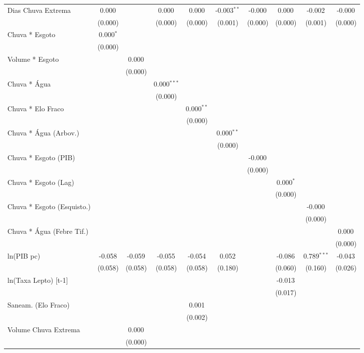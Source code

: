 \documentclass[12pt, a4paper]{article}
\begin{document}
\begin{landscape}
\begin{table}[p]
{\begin{tabular}{@{\extracolsep{5pt}}lccccccccc}
 Dias Chuva Extrema & 0.000$^{}$ & & 0.000$^{}$ & 0.000$^{}$ & -0.003$^{**}$ & -0.000$^{}$ & 0.000$^{}$ & -0.002$^{}$ & -0.000$^{}$ \\
& (0.000) & & (0.000) & (0.000) & (0.001) & (0.000) & (0.000) & (0.001) & (0.000) \\
 Chuva * Esgoto & 0.000$^{*}$ & & & & & & & & \\
& (0.000) & & & & & & & & \\
 Volume * Esgoto & & 0.000$^{}$ & & & & & & & \\
& & (0.000) & & & & & & & \\
 Chuva * Água & & & 0.000$^{***}$ & & & & & & \\
& & & (0.000) & & & & & & \\
 Chuva * Elo Fraco & & & & 0.000$^{**}$ & & & & & \\
& & & & (0.000) & & & & & \\
 Chuva * Água (Arbov.) & & & & & 0.000$^{**}$ & & & & \\
& & & & & (0.000) & & & & \\
 Chuva * Esgoto (PIB) & & & & & & -0.000$^{}$ & & & \\
& & & & & & (0.000) & & & \\
 Chuva * Esgoto (Lag) & & & & & & & 0.000$^{*}$ & & \\
& & & & & & & (0.000) & & \\
 Chuva * Esgoto (Esquisto.) & & & & & & & & -0.000$^{}$ & \\
& & & & & & & & (0.000) & \\
 Chuva * Água (Febre Tif.) & & & & & & & & & 0.000$^{}$ \\
& & & & & & & & & (0.000) \\
 ln(PIB pc) & -0.058$^{}$ & -0.059$^{}$ & -0.055$^{}$ & -0.054$^{}$ & 0.052$^{}$ & & -0.086$^{}$ & 0.789$^{***}$ & -0.043$^{}$ \\
& (0.058) & (0.058) & (0.058) & (0.058) & (0.180) & & (0.060) & (0.160) & (0.026) \\
 ln(Taxa Lepto) [t-1] & & & & & & & -0.013$^{}$ & & \\
& & & & & & & (0.017) & & \\
 Saneam. (Elo Fraco) & & & & 0.001$^{}$ & & & & & \\
& & & & (0.002) & & & & & \\
 Volume Chuva Extrema & & 0.000$^{}$ & & & & & & & \\
& & (0.000) & & & & & & & \\
\midrule %

\end{tabular}}
\end{table}
\end{landscape}
\end{document}
